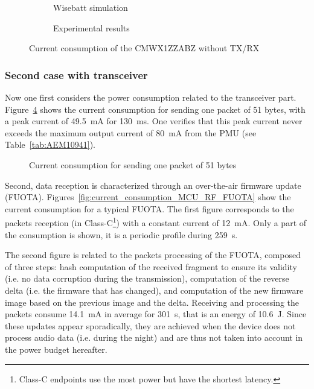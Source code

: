 \documentclass{EPL-master-thesis-covers-EN}
\begin{document}
\begin{figure}[H]
\begin{subfigure}{.49\textwidth}
  \centering
    
    \caption{Wisebatt simulation}
    \label{fig:wisebatt1}
\end{subfigure}
\begin{subfigure}{.49\textwidth}
  \centering
  
  \caption{Experimental results}
  \label{fig:consumption_fft}
\end{subfigure}
\caption{Current consumption of the CMWX1ZZABZ without TX/RX}
\end{figure}


\subsubsection*{Second case with transceiver}

Now one first considers the power consumption related to the transceiver part. Figure~\ref{fig:current_consumption_MCU_RF_lorawan_TX} shows the current consumption for sending one packet of 51 bytes, with a peak current of \SI{49.5}{mA} for \SI{130}{ms}. One verifies that this peak current never exceeds the maximum output current of \SI{80}{mA} from the PMU (see Table~\ref{tab:AEM10941}).

\begin{figure}[H]
    \centering
    
    \caption{Current consumption for sending one packet of 51 bytes}
    \label{fig:current_consumption_MCU_RF_lorawan_TX}
\end{figure}

Second, data reception is characterized through an over-the-air firmware update (FUOTA). Figures~\ref{fig:current_consumption_MCU_RF_FUOTA} show the current consumption for a typical FUOTA. The first figure corresponds to the packets reception (in Class-C\footnote{Class-C endpoints use the most power but have the shortest latency.}) with a constant current of \SI{12}{mA}. Only a part of the consumption is shown, it is a periodic profile during \SI{259}{s}.

The second figure is related to the packets processing of the FUOTA, composed of three steps: hash computation of the received fragment to ensure its validity (i.e. no data corruption during the transmission), computation of the reverse delta (i.e. the firmware that has changed), and computation of the new firmware image based on the previous image and the delta. Receiving and processing the packets consume \SI{14.1}{mA} in average for \SI{301}{s}, that is an energy of \SI{10.6}{J}. Since these updates appear sporadically, they are achieved when the device does not process audio data (i.e. during the night) and are thus not taken into account in the power budget hereafter.
\end{document}
